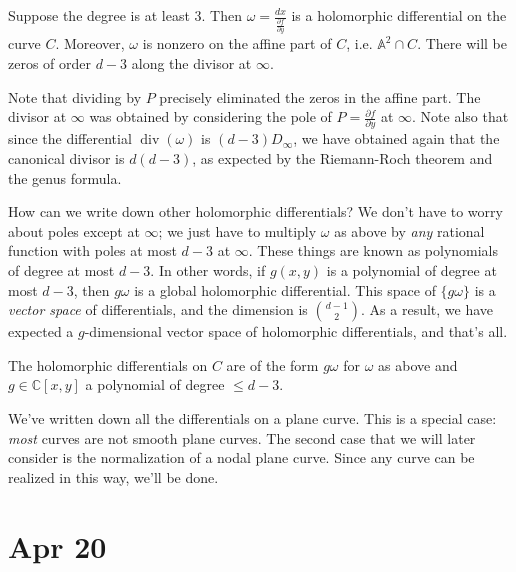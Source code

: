 \documentclass[12pt]{article}
\begin{document}
\begin{proposition}
    Suppose the degree is at least 3. Then $\omega = \frac{dx}{\frac{\partial f}{\partial y}}$ is a holomorphic differential on the curve $C$. Moreover, $\omega$ is nonzero on the affine part of $C$, i.e. $\mathbb{A}^2 \cap C$. There will be zeros of order $d - 3$ along the divisor at $\infty$.    
\end{proposition}


Note that dividing by $P$ precisely eliminated the zeros in the affine part. The divisor at $\infty$ was obtained by considering the pole of $P = \frac{\partial f}{\partial y}$ at $\infty$. Note also that since the differential $\operatorname{div}(\omega)$ is $(d - 3)D_\infty$, we have obtained again that the canonical divisor is $d(d - 3)$, as expected by the Riemann-Roch theorem and the genus formula.

How can we write down other holomorphic differentials? We don't have to worry about poles except at $\infty$; we just have to multiply $\omega$ as above by \textit{any} rational function with poles at most $d - 3$ at $\infty$. These things are known as polynomials of degree at most $d - 3$. In other words, if $g(x,y)$ is a polynomial of degree at most $d - 3$, then $g\omega$ is a global holomorphic differential. This space of $\{g\omega\}$ is a \textit{vector space} of differentials, and the dimension is $\binom{d-1}{2}$. As a result, we have expected a $g$-dimensional vector space of holomorphic differentials, and that's all.

\begin{corollary}
    The holomorphic differentials on $C$ are of the form $g\omega$ for $\omega$ as above and $g \in \mathbb{C}[x,y]$ a polynomial of degree $\leq d - 3$.
\end{corollary}

We've written down all the differentials on a plane curve. This is a special case: \textit{most} curves are not smooth plane curves. The second case that we will later consider is the normalization of a nodal plane curve. Since any curve can be realized in this way, we'll be done.

\section{Apr 20}
\end{document}
